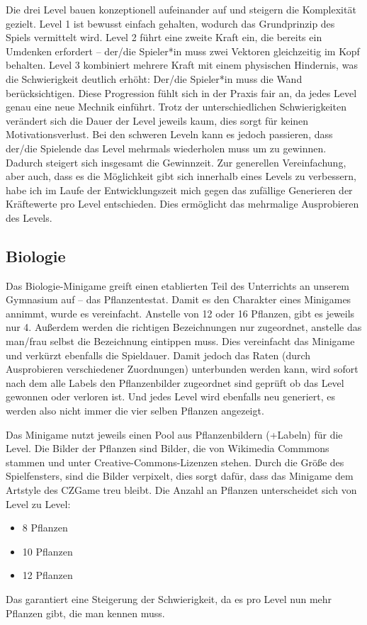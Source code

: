 Die drei Level bauen konzeptionell aufeinander auf und steigern die Komplexität gezielt. Level 1 ist bewusst einfach gehalten, wodurch das Grundprinzip des Spiels vermittelt wird. Level 2 führt eine zweite Kraft ein, die bereits ein Umdenken erfordert – der/die Spieler*in muss zwei Vektoren gleichzeitig im Kopf behalten. Level 3 kombiniert mehrere Kraft mit einem physischen Hindernis, was die Schwierigkeit deutlich erhöht:
Der/die Spieler*in muss die Wand berücksichtigen. Diese Progression fühlt sich in der Praxis fair an, da jedes Level genau eine neue Mechnik einführt. Trotz der unterschiedlichen Schwierigkeiten verändert sich die Dauer der Level jeweils kaum, dies sorgt für keinen Motivationsverlust.
Bei den schweren Leveln kann es jedoch passieren, dass der/die Spielende das Level mehrmals wiederholen muss um zu gewinnen. Dadurch steigert sich insgesamt die Gewinnzeit.
Zur generellen Vereinfachung, aber auch, dass es die Möglichkeit gibt sich innerhalb eines Levels zu verbessern, habe ich im Laufe der Entwicklungszeit mich gegen das zufällige Generieren der Kräftewerte pro Level entschieden. Dies ermöglicht das mehrmalige Ausprobieren des Levels.

\subsection{Biologie}
Das Biologie-Minigame greift einen etablierten Teil des Unterrichts an unserem Gymnasium auf – das Pflanzentestat.
Damit es den Charakter eines Minigames annimmt, wurde es vereinfacht. Anstelle von 12 oder 16 Pflanzen, gibt es jeweils nur 4. Außerdem werden die richtigen Bezeichnungen nur zugeordnet, anstelle das man/frau selbst die Bezeichnung eintippen muss. Dies vereinfacht das Minigame und verkürzt ebenfalls die Spieldauer.
Damit jedoch das Raten (durch Ausprobieren verschiedener Zuordnungen) unterbunden werden kann, wird sofort nach dem alle Labels den Pflanzenbilder zugeordnet sind geprüft ob das Level gewonnen oder verloren ist. Und jedes Level wird ebenfalls neu generiert, es werden also nicht immer die vier selben Pflanzen angezeigt.

Das Minigame nutzt jeweils einen Pool aus Pflanzenbildern (+Labeln) für die Level. Die Bilder der Pflanzen sind Bilder, die von Wikimedia Commmons stammen und unter Creative-Commons-Lizenzen stehen.
Durch die Größe des Spielfensters, sind die Bilder verpixelt, dies sorgt dafür, dass das Minigame dem Artstyle des CZGame treu bleibt.
Die Anzahl an Pflanzen unterscheidet sich von Level zu Level:
\begin{itemize}
\item[\textbf{Level 1}] 8 Pflanzen
\item[\textbf{Level 2}] 10 Pflanzen
\item[\textbf{Level 3}] 12 Pflanzen
\end{itemize}
Das garantiert eine Steigerung der Schwierigkeit, da es pro Level nun mehr Pflanzen gibt, die man kennen muss.

